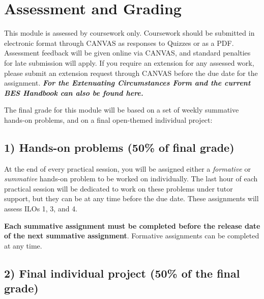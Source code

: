 \documentclass[
]{book}
\let\BeginKnitrBlock\begin \let\EndKnitrBlock\end
\begin{document}
\hypertarget{assessment-and-grading}{%
\section{Assessment and Grading}\label{assessment-and-grading}}

This module is assessed by coursework only. Coursework should be submitted in electronic format through CANVAS as responses to Quizzes or as a PDF. Assessment feedback will be given online via CANVAS, and standard penalties for late submission will apply. If you require an extension for any assessed work, please submit an extension request through CANVAS before the due date for the assignment.
\textbf{\emph{For the Extenuating Circumstances Form and the current BES Handbook can also
be found here.}}

The final grade for this module will be based on a set of weekly summative hands-on problems, and on a final open-themed individual project:

\hypertarget{hands-on-problems-50-of-final-grade}{%
\subsection*{1) Hands-on problems (50\% of final grade)}\label{hands-on-problems-50-of-final-grade}}

At the end of every practical session, you will be assigned either a \emph{formative} or \emph{summative} hands-on problem to be worked on individually. The last hour of each practical session will be dedicated to work on these problems under tutor support, but they can be at any time before the due date. These assignments will assess ILOs 1, 3, and 4.

\BeginKnitrBlock{rmdimportant}
\textbf{Each summative assignment must be completed before the release date of the next summative
assignment}. Formative assignments can be completed at any time.
\EndKnitrBlock{rmdimportant}

\hypertarget{final-individual-project-50-of-the-final-grade}{%
\subsection*{2) Final individual project (50\% of the final grade)}\label{final-individual-project-50-of-the-final-grade}}
\end{document}
